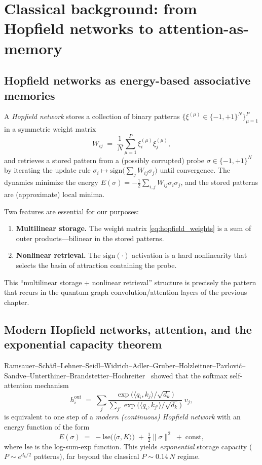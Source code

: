 \documentclass[11pt,oneside]{amsbook}
\numberwithin{equation}{section}
\theoremstyle{plain}
\theoremstyle{definition}
\theoremstyle{remark}
\begin{document}
\section{Classical background: from Hopfield networks to attention-as-memory}
\label{sec:classical_assoc_mem}

\subsection{Hopfield networks as energy-based associative memories}

A \emph{Hopfield network} stores a collection of binary patterns
$\{\xi^{(\mu)}\in\{-1,+1\}^N\}_{\mu=1}^P$ in a symmetric weight matrix
\begin{equation}
  W_{ij}
  \;=\;
  \frac{1}{N}\sum_{\mu=1}^{P}\xi_i^{(\mu)}\xi_j^{(\mu)},
  \label{eq:hopfield_weights}
\end{equation}
and retrieves a stored pattern from a (possibly corrupted) probe $\sigma\in\{-1,+1\}^N$ by
iterating the update rule $\sigma_i\mapsto \mathrm{sign}\bigl(\sum_j W_{ij}\sigma_j\bigr)$
until convergence.  The dynamics minimize the energy
$E(\sigma)=-\frac{1}{2}\sum_{i,j}W_{ij}\sigma_i\sigma_j$,
and the stored patterns are (approximate) local minima.

Two features are essential for our purposes:
\begin{enumerate}
\item \textbf{Multilinear storage.} The weight matrix \eqref{eq:hopfield_weights}
is a sum of outer products---bilinear in the stored patterns.
\item \textbf{Nonlinear retrieval.} The $\mathrm{sign}(\cdot)$ activation is a hard nonlinearity
that selects the basin of attraction containing the probe.
\end{enumerate}
This ``multilinear storage + nonlinear retrieval'' structure is precisely the pattern that recurs
in the quantum graph convolution/attention layers of the previous chapter.

\subsection{Modern Hopfield networks, attention, and the exponential capacity theorem}

Ramsauer--Sch\"afl--Lehner--Seidl--Widrich--Adler--Gruber--Holzleitner--Pavlovi\'c--Sandve--Unterthiner--Brandstetter--Hochreiter~\cite{Ramsauer2020HopfieldAllYouNeed}
showed that the softmax self-attention mechanism
\begin{equation}
  h_i^{\mathrm{out}}
  \;=\;
  \sum_{j}\frac{\exp\!\bigl(\langle q_i,k_j\rangle/\sqrt{d_k}\bigr)}
               {\sum_{j'}\exp\!\bigl(\langle q_i,k_{j'}\rangle/\sqrt{d_k}\bigr)}
  \;v_j,
  \label{eq:modern_hopfield_attention}
\end{equation}
is equivalent to one step of a \emph{modern (continuous) Hopfield network} with an energy function of the form
\[
  E(\sigma)
  \;=\;
  -\mathrm{lse}\!\bigl(\langle \sigma, K\rangle\bigr)
  \;+\;
  \tfrac{1}{2}\|\sigma\|^2
  \;+\;\text{const},
\]
where $\mathrm{lse}$ is the log-sum-exp function.
This yields \emph{exponential} storage capacity ($P\sim e^{d_k/2}$ patterns), far beyond the
classical $P\sim 0.14\,N$ regime.
\end{document}
